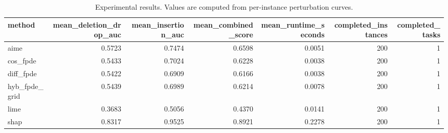 \begin{table}[t]
\caption{Experimental results. Values are computed from per-instance perturbation curves.}
\label{tab:main_results_computed}
\centering
\begin{tabular}{lrrrrrr}
\toprule
method & mean\_deletion\_drop\_auc & mean\_insertion\_auc & mean\_combined\_score & mean\_runtime\_seconds & completed\_instances & completed\_tasks \\
\midrule
aime & 0.5723 & 0.7474 & 0.6598 & 0.0051 & 200 & 1 \\
cos\_fpde & 0.5433 & 0.7024 & 0.6228 & 0.0038 & 200 & 1 \\
diff\_fpde & 0.5422 & 0.6909 & 0.6166 & 0.0038 & 200 & 1 \\
hyb\_fpde\_grid & 0.5439 & 0.6989 & 0.6214 & 0.0078 & 200 & 1 \\
lime & 0.3683 & 0.5056 & 0.4370 & 0.0141 & 200 & 1 \\
shap & 0.8317 & 0.9525 & 0.8921 & 0.2278 & 200 & 1 \\
\bottomrule
\end{tabular}

\end{table}
